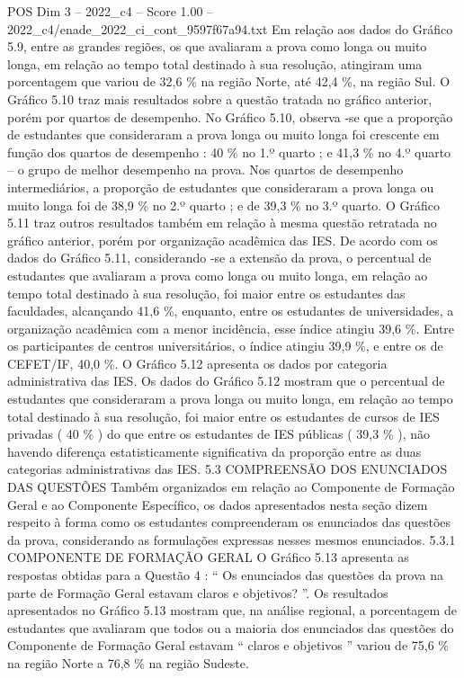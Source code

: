 \begin{textsample}{POS Dim 3 – 2022\_c4 – Score 1.00 – 2022\_c4/enade\_2022\_ci\_cont\_9597f67a94.txt}
Em relação aos dados do Gráfico 5.9, entre as grandes regiões, os que avaliaram a prova como longa ou muito longa, em relação ao tempo total destinado à sua resolução, atingiram uma porcentagem que variou de 32,6 \% na região Norte, até 42,4 \%, na região Sul.
O Gráfico 5.10 traz mais resultados sobre a questão tratada no gráfico anterior, porém por quartos de desempenho.
No Gráfico 5.10, observa -se que a proporção de estudantes que consideraram a prova longa ou muito longa foi crescente em função dos quartos de desempenho : 40 \% no 1.º quarto ; e 41,3 \% no 4.º quarto – o grupo de melhor desempenho na prova.
Nos quartos de desempenho intermediários, a proporção de estudantes que consideraram a prova longa ou muito longa foi de 38,9 \% no 2.º quarto ; e de 39,3 \% no 3.º quarto.
O Gráfico 5.11 traz outros resultados também em relação à mesma questão retratada no gráfico anterior, porém por organização acadêmica das IES.
De acordo com os dados do Gráfico 5.11, considerando -se a extensão da prova, o percentual de estudantes que avaliaram a prova como longa ou muito longa, em relação ao tempo total destinado à sua resolução, foi maior entre os estudantes das faculdades, alcançando 41,6 \%, enquanto, entre os estudantes de universidades, a organização acadêmica com a menor incidência, esse índice atingiu 39,6 \%.
Entre os participantes de centros universitários, o índice atingiu 39,9 \%, e entre os de CEFET/IF, 40,0 \%.
O Gráfico 5.12 apresenta os dados por categoria administrativa das IES.
Os dados do Gráfico 5.12 mostram que o percentual de estudantes que consideraram a prova longa ou muito longa, em relação ao tempo total destinado à sua resolução, foi maior entre os estudantes de cursos de IES privadas ( 40 \% ) do que entre os estudantes de IES públicas ( 39,3 \% ), não havendo diferença estatisticamente significativa da proporção entre as duas categorias administrativas das IES. 5.3 COMPREENSÃO DOS ENUNCIADOS DAS QUESTÕES Também organizados em relação ao Componente de Formação Geral e ao Componente Específico, os dados apresentados nesta seção dizem respeito à forma como os estudantes compreenderam os enunciados das questões da prova, considerando as formulações expressas nesses mesmos enunciados. 5.3.1 COMPONENTE DE FORMAÇÃO GERAL O Gráfico 5.13 apresenta as respostas obtidas para a Questão 4 : “ Os enunciados das questões da prova na parte de Formação Geral estavam claros e objetivos? ”.
Os resultados apresentados no Gráfico 5.13 mostram que, na análise regional, a porcentagem de estudantes que avaliaram que todos ou a maioria dos enunciados das questões do Componente de Formação Geral estavam “ claros e objetivos ” variou de 75,6 \% na região Norte a 76,8 \% na região Sudeste.

\end{textsample}
